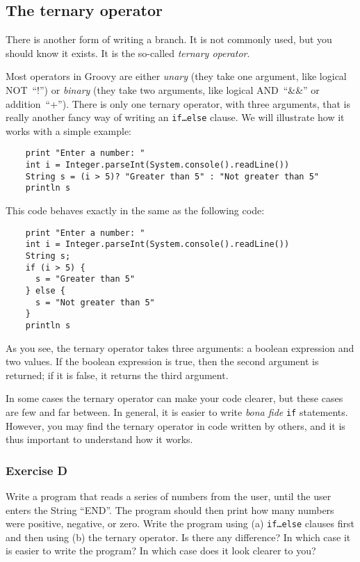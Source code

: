 \subsection{The ternary operator}
\label{sec:ternary-operator}

There is another form of writing a branch. It is not commonly used,
but you should know it exists. It is the so-called \emph{ternary
  operator}. 

Most operators in Groovy are either \emph{unary} (they take one
argument, like logical NOT~``!'') or \emph{binary} (they take two
arguments, like logical AND~``\&\&'' or addition~``+''). There is only
one ternary operator, with three arguments, that is really another
fancy way of writing an \texttt{if\ldots else} clause. We will
illustrate how it works with a simple example:

\begin{verbatim}
    print "Enter a number: "
    int i = Integer.parseInt(System.console().readLine())
    String s = (i > 5)? "Greater than 5" : "Not greater than 5"
    println s
\end{verbatim}

This code behaves exactly in the same as the following code:

\begin{verbatim}
    print "Enter a number: "
    int i = Integer.parseInt(System.console().readLine())
    String s;
    if (i > 5) {
      s = "Greater than 5"
    } else {
      s = "Not greater than 5"
    }
    println s
\end{verbatim}

As you see, the ternary operator takes three arguments: a boolean
expression and two values. If the boolean expression is true, then the
second argument is returned; if it is false, it returns the third
argument. 

In some cases the ternary operator can make your code clearer, but
these cases are few and far between. In general, it is easier to write
\emph{bona fide} \texttt{if} statements. However, you may find the
ternary operator in code written by others, and it is thus important
to understand how it works. 

\subsubsection*{Exercise D}

Write a program that reads a series of numbers from the user, until the
user enters the String ``END''. The program
should then print how many numbers were positive, negative, or
zero. Write the program using (a) \texttt{if\ldots else} clauses first 
and then using (b) the ternary operator. 
Is there any difference? In which case it is
easier to write the program? In which case does it look clearer to you?



